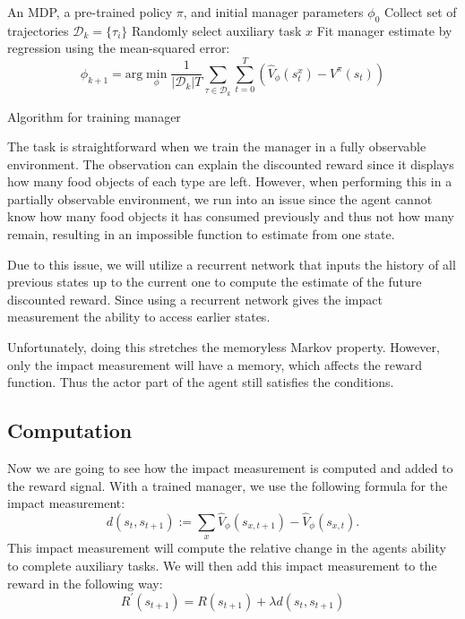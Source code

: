 \documentclass[12pt,A4]{report}
\theoremstyle{definition}
\begin{document}
\begin{algorithm}
\begin{algorithmic}[1]
\Require An MDP, a pre-trained policy $\pi$, and initial manager parameters $\phi_0$
  \State Collect set of trajectories $\mathcal{D}_k = \{\tau_i\}$
  \State Randomly select auxiliary task $x$
  \State Fit manager estimate by regression using the mean-squared error:
  \[ \phi_{k+1} = \text{arg} \min_\phi \frac{1}{|\mathcal{D}_k|T} \sum_{\tau \in \mathcal{D}_k} \sum_{t=0}^T \left( \hat{V}_\phi(s^x_t) - V^\pi (s_t) \right)\]
\EndFor
\end{algorithmic}
\caption{Algorithm for training manager}
  \label{alg:manager}
\end{algorithm}


The task is straightforward when we train the manager in a fully observable environment. The observation can explain the discounted reward since it displays how many food objects of each type are left. However, when performing this in a partially observable environment, we run into an issue since the agent cannot know how many food objects it has consumed previously and thus not how many remain, resulting in an impossible function to estimate from one state. 

Due to this issue, we will utilize a recurrent network that inputs the history of all previous states up to the current one to compute the estimate of the future discounted reward. Since using a recurrent network gives the impact measurement the ability to access earlier states. 

Unfortunately, doing this stretches the memoryless Markov property. However, only the impact measurement will have a memory, which affects the reward function. Thus the actor part of the agent still satisfies the conditions.


\subsection{Computation}
Now we are going to see how the impact measurement is computed and added to the reward signal. With a trained manager, we use the following formula for the impact measurement:
\[ d(s_t,s_{t+1}) := \sum_x \hat{V}_\phi(s_{x,t+1}) - \hat{V}_\phi(s_{x,t}).\]
This impact measurement will compute the relative change in the agents ability to complete auxiliary tasks. We will then add this impact measurement to the reward in the following way: 
\[ R^{\prime}(s_{t+1}) = R(s_{t+1}) + \lambda d(s_t,s_{t+1})\]
\end{document}
